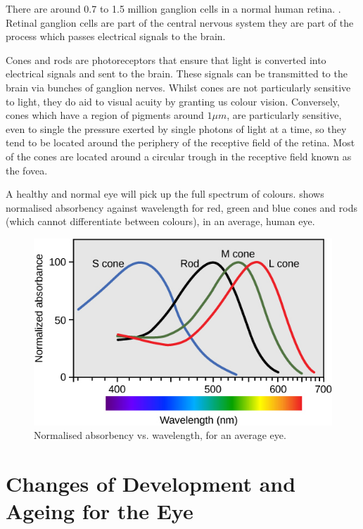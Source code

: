 There are around 0.7 to 1.5 million ganglion cells in a normal human retina.
\cite{curcio1990topography}. Retinal ganglion cells are part of the central
nervous system they are part of the process which passes electrical
signals to the brain.\cite{meyer1995characterization}

Cones and rods are photoreceptors that ensure that light is converted into
electrical signals  and sent to the brain. These signals can
be transmitted to the brain via bunches of ganglion nerves. Whilst cones
are not particularly sensitive to light, they do aid to visual acuity by
granting us colour vision.\cite{bowmaker1980visual} Conversely, cones which
have a region of pigments around $1\mu{m}$, are particularly sensitive,
even to single the pressure exerted by single photons of light at a time,
so they tend to be located around the periphery of the receptive field of
the retina.\cite{liebman1964sensitive,baylor1979responses} Most of the
cones are located around a circular trough in the receptive field known
as the fovea.\cite{hendrickson1994primate}

A healthy and normal eye will pick up the full spectrum of colours.
 shows normalised absorbency against wavelength
for red, green and blue cones and rods (which cannot differentiate
between colours), in an average, human eye.

\begin{figure}[htbp]
  \centering
    \includegraphics{figures/wavelengths}
  \caption{Normalised absorbency vs. wavelength, for an average eye.}
  \label{fig:wavelengths}
\end{figure}

\section{Changes of Development and Ageing for the Eye}


